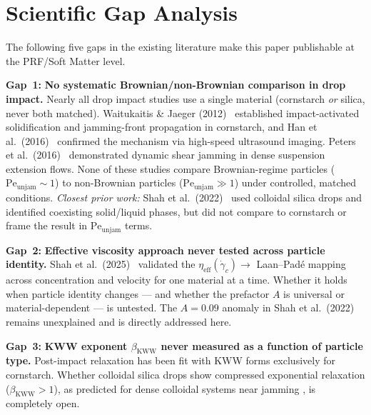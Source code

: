 \documentclass[11pt,letterpaper]{article}
\newcommand{\peunj}{\mathrm{Pe}_{\mathrm{unjam}}}
\newcommand{\etaeff}{\eta_{\mathrm{eff}}}
\newcommand{\gamcrit}{\dot{\gamma}_c}
\newcommand{\bkww}{\beta_{\mathrm{KWW}}}
\newcommand{\gap}[1]{\textbf{\color{gapborder}Gap~#1:}}
\begin{document}
\section{Scientific Gap Analysis}

The following five gaps in the existing literature make this paper publishable
at the PRF/Soft Matter level.

\begin{gapbox}
\gap{1} \textbf{No systematic Brownian/non-Brownian comparison in drop impact.}
Nearly all drop impact studies use a single material (cornstarch \emph{or}
silica, never both matched). Waitukaitis \& Jaeger (2012)~\cite{Waitukaitis2012}
established impact-activated solidification and jamming-front propagation in
cornstarch, and Han et al.\ (2016)~\cite{HanJaeger2016} confirmed the mechanism
via high-speed ultrasound imaging. Peters et al.\ (2016)~\cite{Peters2016}
demonstrated dynamic shear jamming in dense suspension extension flows. None
of these studies compare Brownian-regime particles ($\peunj \sim 1$) to
non-Brownian particles ($\peunj \gg 1$) under controlled, matched conditions.
\emph{Closest prior work:} Shah et al.\ (2022)~\cite{Shah2022} used colloidal
silica drops and identified coexisting solid/liquid phases, but did not compare
to cornstarch or frame the result in $\peunj$ terms.
\end{gapbox}

\begin{gapbox}
\gap{2} \textbf{Effective viscosity approach never tested across particle identity.}
Shah et al.\ (2025)~\cite{Mobaseri2025} validated the $\etaeff(\gamcrit)
\to$ Laan--Padé mapping across concentration and velocity for one material at
a time. Whether it holds when particle identity changes --- and whether the
prefactor $A$ is universal or material-dependent --- is untested. The $A = 0.09$
anomaly in Shah et al.\ (2022)~\cite{Shah2022} remains unexplained and is
directly addressed here.
\end{gapbox}

\begin{gapbox}
\gap{3} \textbf{KWW exponent $\bkww$ never measured as a function of particle type.}
Post-impact relaxation has been fit with KWW forms exclusively for cornstarch.
Whether colloidal silica drops show compressed exponential relaxation
($\bkww > 1$), as predicted for dense colloidal systems near jamming
\cite{Ballesta2008}, is completely open.
\end{gapbox}
\end{document}
